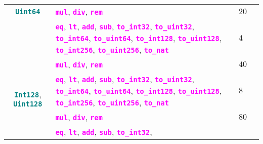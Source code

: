 \documentclass[9pt]{article}
\begin{document}
\begin{table}[!hbt]
\begin{tabular}{|c|p{4.1cm}|p{4cm}|p{5cm}|}
{		\textbf{\texttt{\textcolor{teal}{Uint64}}}} &
		\textbf{\texttt{\textcolor{magenta}{mul}}},
		 \textbf{\texttt{\textcolor{magenta}{div}}},
		 \textbf{\texttt{\textcolor{magenta}{rem}}} &
		 $ 20 $  & \\ \cline{2-4}
		 & 
		 \textbf{\texttt{\textcolor{magenta}{eq}}},
		 \textbf{\texttt{\textcolor{magenta}{lt}}},
		 \textbf{\texttt{\textcolor{magenta}{add}}},
		 \textbf{\texttt{\textcolor{magenta}{sub}}},
		 \textbf{\texttt{\textcolor{magenta}{to\_int32}}},
		 \textbf{\texttt{\textcolor{magenta}{to\_uint32}}},
		 \textbf{\texttt{\textcolor{magenta}{to\_int64}}},
		 \textbf{\texttt{\textcolor{magenta}{to\_uint64}}},
		 \textbf{\texttt{\textcolor{magenta}{to\_int128}}},
		 \textbf{\texttt{\textcolor{magenta}{to\_uint128}}},
		 \textbf{\texttt{\textcolor{magenta}{to\_int256}}},
		 \textbf{\texttt{\textcolor{magenta}{to\_uint256}}},
		 \textbf{\texttt{\textcolor{magenta}{to\_nat}}}
		 & $4$  & \\ \hline \hline
		\multirow{4}{*}{\textbf{\texttt{\textcolor{teal}{Int128}}},
		\textbf{\texttt{\textcolor{teal}{Uint128}}}} &
		\textbf{\texttt{\textcolor{magenta}{mul}}},
		 \textbf{\texttt{\textcolor{magenta}{div}}},
		 \textbf{\texttt{\textcolor{magenta}{rem}}} &
		 $ 40 $  & \\ \cline{2-4}
		 & 
		 \textbf{\texttt{\textcolor{magenta}{eq}}},
		 \textbf{\texttt{\textcolor{magenta}{lt}}},
		 \textbf{\texttt{\textcolor{magenta}{add}}},
		 \textbf{\texttt{\textcolor{magenta}{sub}}},
		 \textbf{\texttt{\textcolor{magenta}{to\_int32}}},
		 \textbf{\texttt{\textcolor{magenta}{to\_uint32}}},
		 \textbf{\texttt{\textcolor{magenta}{to\_int64}}},
		 \textbf{\texttt{\textcolor{magenta}{to\_uint64}}},
		 \textbf{\texttt{\textcolor{magenta}{to\_int128}}},
		 \textbf{\texttt{\textcolor{magenta}{to\_uint128}}},
		 \textbf{\texttt{\textcolor{magenta}{to\_int256}}},
		 \textbf{\texttt{\textcolor{magenta}{to\_uint256}}},
		 \textbf{\texttt{\textcolor{magenta}{to\_nat}}}
		 & $8$  & \\ \hline \hline
		\multirow{4}{*}{\textbf{\texttt{\textcolor{teal}{Int256}}},
		\textbf{\texttt{\textcolor{teal}{Uint256}}}} &
		\textbf{\texttt{\textcolor{magenta}{mul}}},
		 \textbf{\texttt{\textcolor{magenta}{div}}},
		 \textbf{\texttt{\textcolor{magenta}{rem}}} &
		 $ 80 $  & \\ \cline{2-4}
		 &
		 \textbf{\texttt{\textcolor{magenta}{eq}}},
		 \textbf{\texttt{\textcolor{magenta}{lt}}},
		 \textbf{\texttt{\textcolor{magenta}{add}}},
		 \textbf{\texttt{\textcolor{magenta}{sub}}},
		 \textbf{\texttt{\textcolor{magenta}{to\_int32}}},

\end{tabular}
\end{table}
\end{document}
